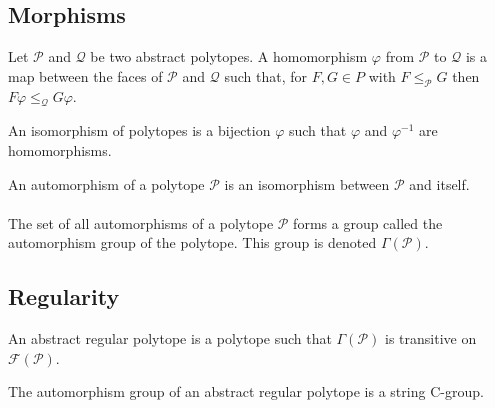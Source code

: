 \subsection{Morphisms}

\begin{definition}
  Let $\mathcal P$ and $\mathcal Q$ be two abstract polytopes. A homomorphism $\varphi$ from $\mathcal P$ to $\mathcal Q$ is a map between the faces of $\mathcal P$ and $\mathcal Q$ such that, for $F, G \in P$ with $F \le_{\mathcal P} G$ then $F\varphi \le_{\mathcal Q} G\varphi$.
\end{definition}

\begin{definition}
  An isomorphism of polytopes is a bijection $\varphi$ such that $\varphi$ and $\varphi^{-1}$ are homomorphisms.
\end{definition}

\begin{definition}
  An automorphism of a polytope $\mathcal P$ is an isomorphism between $\mathcal P$ and itself.
\end{definition}

\paragraph{}
The set of all automorphisms of a polytope $\mathcal P$ forms a group called the automorphism group of the polytope. This group is denoted $\Gamma(\mathcal P)$.

\subsection{Regularity}

\begin{definition}
  An abstract regular polytope is a polytope such that $\Gamma(\mathcal P)$ is transitive on $\mathcal F(\mathcal P)$.
\end{definition}

\begin{theorem}
  The automorphism group of an abstract regular polytope is a string C-group.
\end{theorem}
